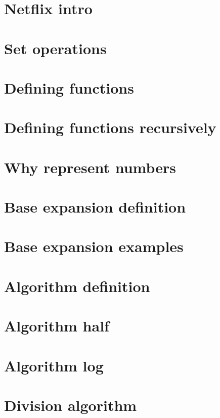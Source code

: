 
\section*{Netflix intro}

\vfill
\section*{Set operations}

\vfill
\section*{Defining functions}

\vfill
\section*{Defining functions recursively}

\vfill
\section*{Why represent numbers}

\vfill
\section*{Base expansion definition}

\vfill
\section*{Base expansion examples}

\vfill
\section*{Algorithm definition}

\vfill
\section*{Algorithm half}

\vfill
\section*{Algorithm log}

\vfill
\section*{Division algorithm}

\vfill
